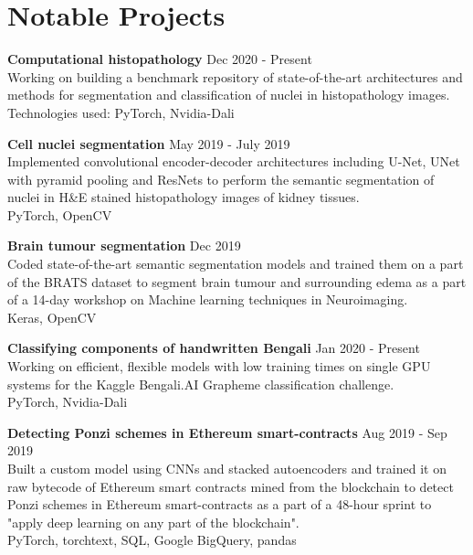 \documentclass[letterpaper]{article}
\renewenvironment{itemize}{
  \begin{list}{}{
    \setlength{\leftmargin}{1.5em}
  }
}{
  \end{list}
}
\newcommand{\smallGreyFont}[1]{\textcolor{black!80}{\small{#1}}}
\begin{document}
\section*{Notable Projects}
  \begin{itemize}
    \item
    \textbf{Computational histopathology}
    \hfill{\smallGreyFont{Dec 2020 - Present}}\\
      Working on building a benchmark repository of state-of-the-art architectures and methods for segmentation and classification of nuclei in histopathology images.\\
      \smallGreyFont{Technologies used: PyTorch, Nvidia-Dali}

    \item
    \textbf{Cell nuclei segmentation}
    \hfill{\smallGreyFont{May 2019 - July 2019}}\\
      Implemented convolutional encoder-decoder architectures including U-Net, UNet with pyramid pooling and ResNets to perform the semantic segmentation of nuclei in H\&E stained histopathology images of kidney tissues.\\
      \smallGreyFont{PyTorch, OpenCV}

    \item
    \textbf{Brain tumour segmentation}
    \hfill{\smallGreyFont{Dec 2019}}\\
       Coded state-of-the-art semantic segmentation models and trained them on a part of the BRATS dataset to segment brain tumour and surrounding edema as a part of a 14-day workshop on Machine learning techniques in Neuroimaging.\\
       \smallGreyFont{Keras, OpenCV}

    \item
    \textbf{Classifying components of handwritten Bengali}
    \hfill{\smallGreyFont{Jan 2020 - Present}}\\
      Working on efficient, flexible models with low training times on single GPU systems for the Kaggle Bengali.AI Grapheme classification challenge.\\
      \smallGreyFont{PyTorch, Nvidia-Dali}

    \item
    \textbf{Detecting Ponzi schemes in Ethereum smart-contracts}
    \hfill{\smallGreyFont{Aug 2019 - Sep 2019}}\\
      Built a custom model using CNNs and stacked autoencoders and trained it on raw bytecode of Ethereum smart contracts mined from the blockchain to detect Ponzi schemes in Ethereum smart-contracts as a part of a 48-hour sprint to "apply deep learning on any part of the blockchain".\\
      \smallGreyFont{PyTorch, torchtext, SQL, Google BigQuery, pandas}


\end{itemize}
\end{document}
